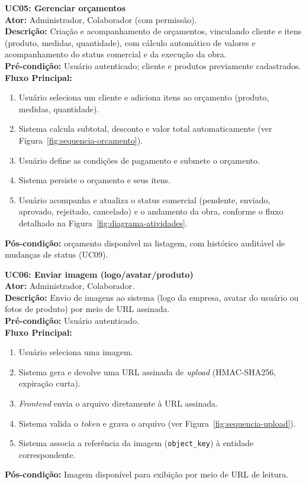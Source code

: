\medskip
\noindent\textbf{UC05: Gerenciar orçamentos}\\
\textbf{Ator:} Administrador, Colaborador (com permissão).\\
\textbf{Descrição:} Criação e acompanhamento de orçamentos, vinculando cliente e itens (produto, medidas, quantidade), com cálculo automático de valores e acompanhamento do status comercial e da execução da obra.\\
\textbf{Pré-condição:} Usuário autenticado; cliente e produtos previamente cadastrados.\\
\textbf{Fluxo Principal:}
\begin{enumerate}
  \item Usuário seleciona um cliente e adiciona itens ao orçamento (produto, medidas, quantidade).
  \item Sistema calcula subtotal, desconto e valor total automaticamente (ver Figura~\ref{fig:sequencia-orcamento}).
  \item Usuário define as condições de pagamento e submete o orçamento.
  \item Sistema persiste o orçamento e seus itens.
  \item Usuário acompanha e atualiza o status comercial (pendente, enviado, aprovado, rejeitado, cancelado) e o andamento da obra, conforme o fluxo detalhado na Figura~\ref{fig:diagrama-atividades}.
\end{enumerate}
\textbf{Pós-condição:} orçamento disponível na listagem, com histórico auditável de mudanças de status (UC09).

\medskip
\noindent\textbf{UC06: Enviar imagem (logo/avatar/produto)}\\
\textbf{Ator:} Administrador, Colaborador.\\
\textbf{Descrição:} Envio de imagens ao sistema (logo da empresa, avatar do usuário ou fotos de produto) por meio de URL assinada.\\
\textbf{Pré-condição:} Usuário autenticado.\\
\textbf{Fluxo Principal:}
\begin{enumerate}
  \item Usuário seleciona uma imagem.
  \item Sistema gera e devolve uma URL assinada de \textit{upload} (HMAC-SHA256, expiração curta).
  \item \textit{Frontend} envia o arquivo diretamente à URL assinada.
  \item Sistema valida o \textit{token} e grava o arquivo (ver Figura~\ref{fig:sequencia-upload}).
  \item Sistema associa a referência da imagem (\texttt{object\_key}) à entidade correspondente.
\end{enumerate}
\textbf{Pós-condição:} Imagem disponível para exibição por meio de URL de leitura.

